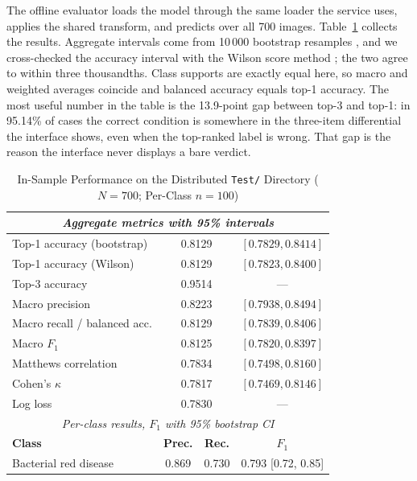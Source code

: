 \documentclass[conference]{IEEEtran}
\begin{document}
The offline evaluator loads the model through the same loader the service uses, applies the shared transform, and predicts over all 700 images. Table~\ref{tab:results} collects the results. Aggregate intervals come from 10\,000 bootstrap resamples \cite{b19}, and we cross-checked the accuracy interval with the Wilson score method \cite{b17}; the two agree to within three thousandths. Class supports are exactly equal here, so macro and weighted averages coincide and balanced accuracy equals top-1 accuracy. The most useful number in the table is the 13.9-point gap between top-3 and top-1: in 95.14\% of cases the correct condition is somewhere in the three-item differential the interface shows, even when the top-ranked label is wrong. That gap is the reason the interface never displays a bare verdict.

\begin{table}[!t]
\caption{In-Sample Performance on the Distributed \texttt{Test/} Directory
($N=700$; Per-Class $n=100$)}
\label{tab:results}
\centering
\scriptsize
\setlength{\tabcolsep}{4pt}
\begin{tabular}{lccc}
\toprule
\multicolumn{4}{c}{\textit{Aggregate metrics with 95\% intervals}}\\
\midrule
Top-1 accuracy (bootstrap) & \multicolumn{2}{c}{0.8129} & $[0.7829, 0.8414]$\\
Top-1 accuracy (Wilson) & \multicolumn{2}{c}{0.8129} & $[0.7823, 0.8400]$\\
Top-3 accuracy & \multicolumn{2}{c}{0.9514} & ---\\
Macro precision & \multicolumn{2}{c}{0.8223} & $[0.7938, 0.8494]$\\
Macro recall / balanced acc. & \multicolumn{2}{c}{0.8129} & $[0.7839, 0.8406]$\\
Macro $F_1$ & \multicolumn{2}{c}{0.8125} & $[0.7820, 0.8397]$\\
Matthews correlation \cite{b21} & \multicolumn{2}{c}{0.7834} & $[0.7498, 0.8160]$\\
Cohen's $\kappa$ \cite{b20} & \multicolumn{2}{c}{0.7817} & $[0.7469, 0.8146]$\\
Log loss & \multicolumn{2}{c}{0.7830} & ---\\
\midrule
\multicolumn{4}{c}{\textit{Per-class results, $F_1$ with 95\% bootstrap CI}}\\
\midrule
\textbf{Class} & \textbf{Prec.} & \textbf{Rec.} & \textbf{$F_1$}\\
\midrule
Bacterial red disease & 0.869 & 0.730 & 0.793 [0.72, 0.85]\\

\end{tabular}
\end{table}
\end{document}
